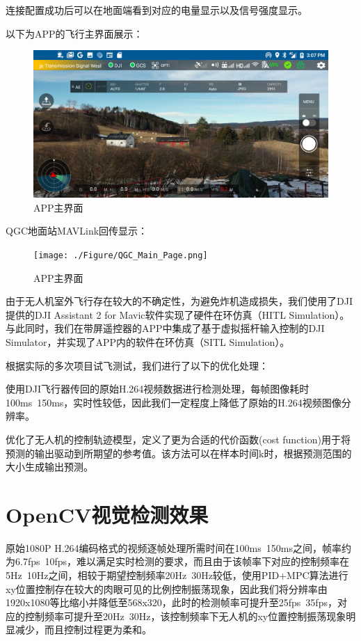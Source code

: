 连接配置成功后可以在地面端看到对应的电量显示以及信号强度显示。

以下为APP的飞行主界面展示：

\begin{figure}[ht]
  \centering
  \includegraphics[width=0.8\linewidth]{./Figure/APP_Main_Page.png}
  \caption{APP主界面}\label{Fig:xd1}
\end{figure}

QGC地面站MAVLink回传显示：

\begin{figure}[ht]
  \centering
  \texttt{[image: ./Figure/QGC\_Main\_Page.png]}
  \caption{APP主界面}\label{Fig:xd1}
\end{figure}

由于无人机室外飞行存在较大的不确定性，为避免炸机造成损失，我们使用了DJI提供的DJI Assistant 2 for Mavic软件实现了硬件在环仿真（HITL Simulation）。与此同时，我们在带屏遥控器的APP中集成了基于虚拟摇杆输入控制的DJI Simulator，并实现了APP内的软件在环仿真（SITL Simulation）。

根据实际的多次项目试飞测试，我们进行了以下的优化处理：

使用DJI飞行器传回的原始H.264视频数据进行检测处理，每帧图像耗时100ms~150ms，实时性较低，因此我们一定程度上降低了原始的H.264视频图像分辨率。

优化了无人机的控制轨迹模型，定义了更为合适的代价函数(cost function)用于将预测的输出驱动到所期望的参考值。该方法可以在样本时间k时，根据预测范围的大小生成输出预测。

\section{OpenCV视觉检测效果}

原始1080P H.264编码格式的视频逐帧处理所需时间在100ms~150ms之间，帧率约为6.7fps~10fps，难以满足实时检测的要求，而且由于该帧率下对应的控制频率在5Hz~10Hz之间，相较于期望控制频率20Hz~30Hz较低，使用PID+MPC算法进行xy位置控制存在较大的肉眼可见的比例控制振荡现象，因此我们将分辨率由1920x1080等比缩小并降低至568x320，此时的检测帧率可提升至25fps~35fps，对应的控制频率可提升至20Hz~30Hz，该控制频率下无人机的xy位置控制振荡现象明显减少，而且控制过程更为柔和。

